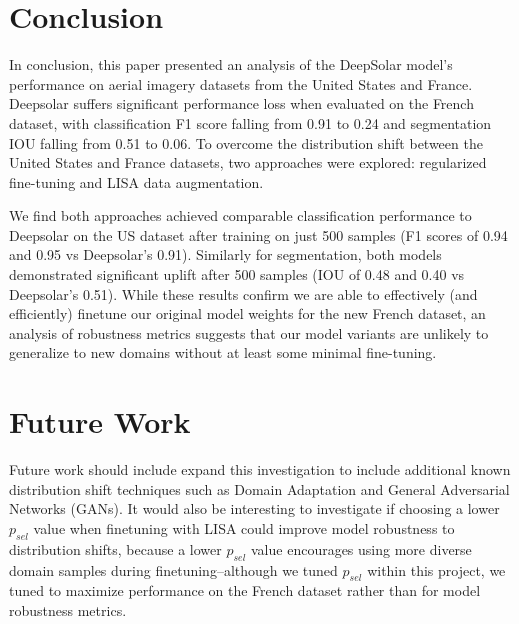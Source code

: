 \documentclass[10pt,twocolumn,letterpaper]{article}
\begin{document}
\section{Conclusion}

In conclusion, this paper presented an analysis of the DeepSolar model's performance on aerial imagery datasets from the United States and France. Deepsolar suffers significant performance loss when evaluated on the French dataset, with classification F1 score falling from 0.91 to 0.24 and segmentation IOU falling from 0.51 to 0.06. To overcome the distribution shift between the United States and France datasets, two approaches were explored: regularized fine-tuning and LISA data augmentation. 

We find both approaches achieved comparable classification performance to Deepsolar on the US dataset after training on just 500 samples (F1 scores of 0.94 and 0.95 vs Deepsolar's 0.91). Similarly for segmentation, both models demonstrated significant uplift after 500 samples (IOU of 0.48 and 0.40 vs Deepsolar's 0.51). While these results confirm we are able to effectively (and efficiently) finetune our original model weights for the new French dataset, an analysis of robustness metrics suggests that our model variants are unlikely to generalize to new domains without at least some minimal fine-tuning. 

\section{Future Work}

Future work should include expand this investigation to include additional known distribution shift techniques such as Domain Adaptation and General Adversarial Networks (GANs). It would also be interesting to investigate if choosing a lower $p_{sel}$ value when finetuning with LISA could improve model robustness to distribution shifts, because a lower $p_{sel}$ value encourages using more diverse domain samples during finetuning--although we tuned $p_{sel}$ within this project, we tuned to maximize performance on the French dataset rather than for model robustness metrics. 
\end{document}
